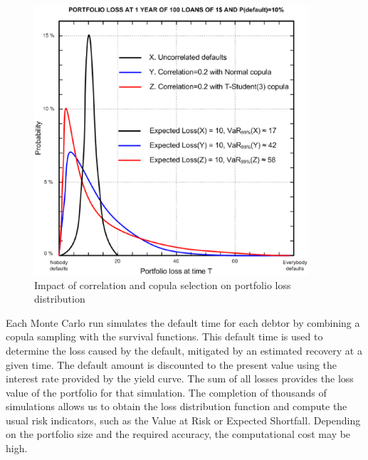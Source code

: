 \documentclass[a4paper,12pt,final]{article}
\begin{document}
\begin{figure}[!hbt]
\begin{center}
\includegraphics[height=10cm]{./images/ercim78.eps}
\caption{Impact of correlation and copula selection on portfolio loss distribution}
\label{correlation_impact}
\end{center}
\end{figure}
\FloatBarrier

Each Monte Carlo run simulates the default time for each debtor by combining a copula 
sampling with the survival functions. This default time is used to determine the loss 
caused by the default, mitigated by an estimated recovery at a given time. The default 
amount is discounted to the present value using the interest rate provided by the yield 
curve. The sum of all losses provides the loss value of the portfolio for that simulation. 
The completion of thousands of simulations allows us to obtain the loss distribution 
function and compute the usual risk indicators, such as the Value at Risk or Expected 
Shortfall. Depending on the portfolio size and the required accuracy, the computational 
cost may be high.
\newline

\end{document}
